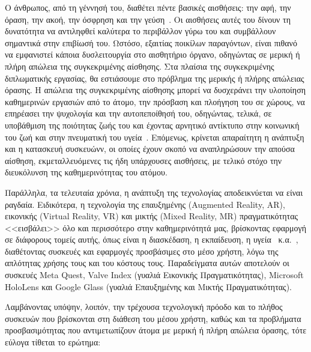 
\setlength{\parindent}{24pt}
Ο άνθρωπος, από τη γέννησή του, διαθέτει πέντε βασικές αισθήσεις: την αφή, την όραση, την ακοή, την όσφρηση και την γεύση~\cite{bradford_2017_the}. Οι αισθήσεις αυτές του δίνουν τη δυνατότητα να αντιληφθεί καλύτερα το περιβάλλον γύρω του και συμβάλλουν σημαντικά στην επιβίωσή του. Ωστόσο, εξαιτίας ποικίλων παραγόντων, είναι πιθανό να εμφανιστεί κάποια δυσλειτουργία στο αισθητήριο όργανο, οδηγώντας σε μερική ή πλήρη απώλεια της συγκεκριμένης αίσθησης. Στα πλαίσια της συγκεκριμένης διπλωματικής εργασίας, θα εστιάσουμε στο πρόβλημα της μερικής ή πλήρης απώλειας όρασης. Η απώλεια της συγκεκριμένης αίσθησης μπορεί να δυσχεράνει την υλοποίηση καθημερινών εργασιών από το άτομο, την πρόσβαση και πλοήγηση του σε χώρους, να επηρέασει την ψυχολογία και την αυτοπεποίθησή του, οδηγώντας, τελικά, σε υποβάθμιση της ποιότητας ζωής του και έχοντας αρνητικό αντίκτυπο στην κοινωνική του ζωή και στην πνευματική του υγεία~\cite{worldhealthorganization_2023_blindness}\cite{maaikelangelaan_2007_quality}. Επόμενως, κρίνεται απαραίτητη η ανάπτυξη και η κατασκευή συσκευώνν, οι οποίες έχουν σκοπό να αναπληρώσουν την απούσα αίσθηση, εκμεταλλευόμενες τις ήδη υπάρχουσες αισθήσεις, με τελικό στόχο την διευκόλυνση της καθημερινότητας του ατόμου.

Παράλληλα, τα τελευταία χρόνια, η ανάπτυξη της τεχνολογίας αποδεικνύεται να είναι ραγδαία. Ειδικότερα, η τεχνολογία της επαυξημένης (Augmented Reality, AR), εικονικής (Virtual Reality, VR) και μικτής (Mixed Reality, MR) πραγματικότητας <<εισβάλει>> όλο και περισσότερο στην καθημερινότητά μας, βρίσκοντας εφαρμογή σε διάφορους τομείς αυτής, όπως είναι η διασκέδαση, η εκπαίδευση, η υγεία~\cite{morgan_2021_the} κ.α.~\cite{wikipediacontributors_2019_mixed}, διαθέτοντας συσκευές και εφαρμογές προσβάσιμες στο μέσο χρήστη, λόγω της απλότητας χρήσης τους και του κόστους τους. Παραδείγματα αυτών αποτελούν οι συσκευές Meta Quest, Valve Index (γυαλιά Εικονικής Πραγματικότητας), Microsoft HoloLens και Google Glass (γυαλιά Επαυξημένης και Μικτής Πραγματικότητας). %

Λαμβάνοντας υπόψην, λοιπόν, την τρέχουσα τεχνολογική πρόοδο και το πλήθος συσκευών που βρίσκονται στη διάθεση του μέσου χρήστη, καθώς και τα προβλήματα προσβασιμότητας που αντιμετωπίζουν άτομα με μερική ή πλήρη απώλεια όρασης, τότε εύλογα τίθεται το ερώτημα:


